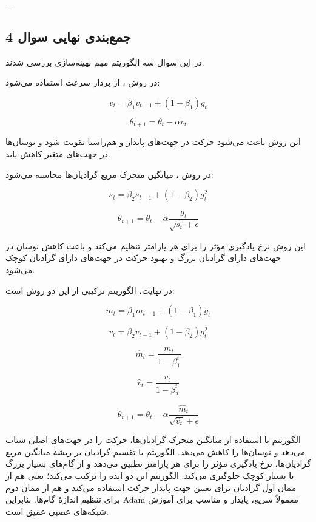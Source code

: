 \documentclass[12pt,a4paper]{article}
\begin{document}
---

\subsection{جمع‌بندی نهایی سوال 4}

در این سوال سه الگوریتم مهم بهینه‌سازی بررسی شدند.

در روش ، از بردار سرعت استفاده می‌شود:

\[
v_t = \beta_1 v_{t-1} + (1-\beta_1)g_t
\]

\[
\theta_{t+1} = \theta_t - \alpha v_t
\]

این روش باعث می‌شود حرکت در جهت‌های پایدار و هم‌راستا تقویت شود و نوسان‌ها در جهت‌های متغیر کاهش یابد.

در روش ، میانگین متحرک مربع گرادیان‌ها محاسبه می‌شود:

\[
s_t = \beta_2 s_{t-1} + (1-\beta_2)g_t^2
\]

\[
\theta_{t+1}=\theta_t-\alpha \frac{g_t}{\sqrt{s_t}+\epsilon}
\]

این روش نرخ یادگیری مؤثر را برای هر پارامتر تنظیم می‌کند و باعث کاهش نوسان در جهت‌های دارای گرادیان بزرگ و بهبود حرکت در جهت‌های دارای گرادیان کوچک می‌شود.

در نهایت، الگوریتم  ترکیبی از این دو روش است:

\[
m_t = \beta_1 m_{t-1} + (1-\beta_1)g_t
\]

\[
v_t = \beta_2 v_{t-1} + (1-\beta_2)g_t^2
\]

\[
\hat{m}_t=\frac{m_t}{1-\beta_1^t}
\]

\[
\hat{v}_t=\frac{v_t}{1-\beta_2^t}
\]

\[
\theta_{t+1}
=
\theta_t
-
\alpha
\frac{\hat{m}_t}{\sqrt{\hat{v}_t}+\epsilon}
\]

\begin{tcolorbox}[
	colback=softgray,
	colframe=mainblue,
	title=پاسخ نهایی فشرده سوال 4
	]
	الگوریتم  با استفاده از میانگین متحرک گرادیان‌ها، حرکت را در جهت‌های اصلی شتاب می‌دهد و نوسان‌ها را کاهش می‌دهد. الگوریتم  با تقسیم گرادیان بر ریشهٔ میانگین مربع گرادیان‌ها، نرخ یادگیری مؤثر را برای هر پارامتر تطبیق می‌دهد و از گام‌های بسیار بزرگ یا بسیار کوچک جلوگیری می‌کند. الگوریتم  این دو ایده را ترکیب می‌کند؛ یعنی هم از ممان اول گرادیان برای تعیین جهت پایدار حرکت استفاده می‌کند و هم از ممان دوم برای تنظیم اندازهٔ گام‌ها. بنابراین Adam معمولاً سریع، پایدار و مناسب برای آموزش شبکه‌های عصبی عمیق است.
\end{tcolorbox}
	
\end{document}
